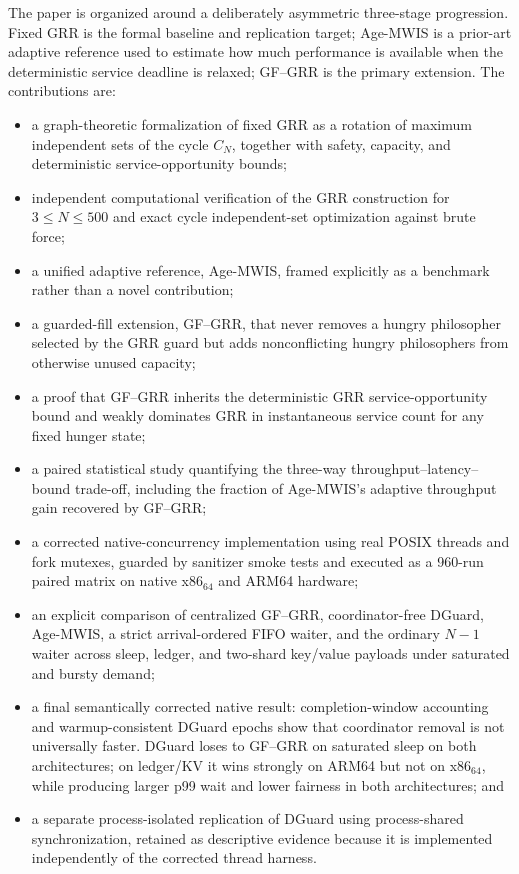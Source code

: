 \documentclass[10pt,journal]{IEEEtran}
\newcommand{\GF}{\textsc{GF--GRR}\xspace}
\begin{document}
The paper is organized around a deliberately asymmetric three-stage progression. Fixed GRR is the formal baseline and replication target; Age-MWIS is a prior-art adaptive reference used to estimate how much performance is available when the deterministic service deadline is relaxed; GF--GRR is the primary extension. The contributions are:
\begin{itemize}
\item a graph-theoretic formalization of fixed GRR as a rotation of maximum independent sets of the cycle $C_N$, together with safety, capacity, and deterministic service-opportunity bounds;
\item independent computational verification of the GRR construction for $3\le N\le500$ and exact cycle independent-set optimization against brute force;
\item a unified adaptive reference, Age-MWIS, framed explicitly as a benchmark rather than a novel contribution;
\item a guarded-fill extension, \GF, that never removes a hungry philosopher selected by the GRR guard but adds nonconflicting hungry philosophers from otherwise unused capacity;
\item a proof that \GF inherits the deterministic GRR service-opportunity bound and weakly dominates GRR in instantaneous service count for any fixed hunger state;
\item a paired statistical study quantifying the three-way throughput--latency--bound trade-off, including the fraction of Age-MWIS's adaptive throughput gain recovered by \GF;
\item a corrected native-concurrency implementation using real POSIX threads and fork mutexes, guarded by sanitizer smoke tests and executed as a 960-run paired matrix on native x86$_{64}$ and ARM64 hardware;
\item an explicit comparison of centralized GF--GRR, coordinator-free DGuard, Age-MWIS, a strict arrival-ordered FIFO waiter, and the ordinary $N-1$ waiter across sleep, ledger, and two-shard key/value payloads under saturated and bursty demand;
\item a final semantically corrected native result: completion-window accounting and warmup-consistent DGuard epochs show that coordinator removal is not universally faster. DGuard loses to GF--GRR on saturated sleep on both architectures; on ledger/KV it wins strongly on ARM64 but not on x86$_{64}$, while producing larger p99 wait and lower fairness in both architectures; and
\item a separate process-isolated replication of DGuard using process-shared synchronization, retained as descriptive evidence because it is implemented independently of the corrected thread harness.
\end{itemize}
\end{document}
